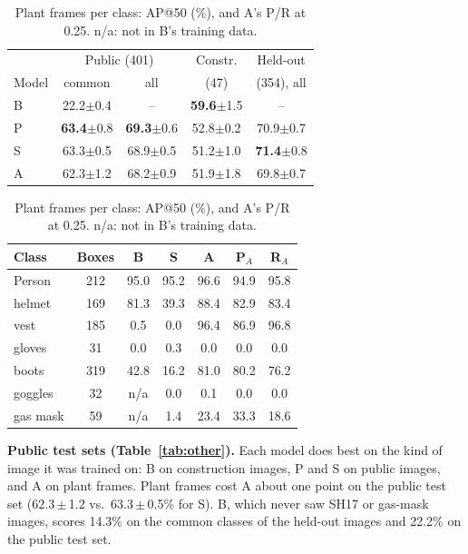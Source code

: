 \begin{table}[H]
\centering
\scriptsize
\setlength{\tabcolsep}{3pt}
\begin{minipage}[t]{0.47\columnwidth}
\centering
\caption{Public test sets, mAP@50 (\%), mean $\pm$ s.d. Held-out: SH17 + gas-mask test images, whose sources are in training.}
\label{tab:other}
\begin{tabular}{lcccc}
\toprule
& \multicolumn{2}{c}{Public (401)} & Constr. & Held-out \\
Model & common & all & (47) & (354), all \\
\midrule
B & 22.2$\pm$0.4 & -- & \textbf{59.6}$\pm$1.5 & -- \\
P & \textbf{63.4}$\pm$0.8 & \textbf{69.3}$\pm$0.6 & 52.8$\pm$0.2 & 70.9$\pm$0.7 \\
S & 63.3$\pm$0.5 & 68.9$\pm$0.5 & 51.2$\pm$1.0 & \textbf{71.4}$\pm$0.8 \\
A & 62.3$\pm$1.2 & 68.2$\pm$0.9 & 51.9$\pm$1.8 & 69.8$\pm$0.7 \\
\bottomrule
\end{tabular}
\end{minipage}\hfill
\begin{minipage}[t]{0.5\columnwidth}
\centering
\caption{Plant frames per class: AP@50 (\%), and A's P/R at 0.25. n/a: not in B's training data.}
\label{tab:perclass}
\begin{tabular}{lcccccc}
\toprule
Class & Boxes & B & S & A & P$_A$ & R$_A$ \\
\midrule
Person   & 212 & 95.0 & 95.2 & 96.6 & 94.9 & 95.8 \\
helmet   & 169 & 81.3 & 39.3 & 88.4 & 82.9 & 83.4 \\
vest     & 185 & 0.5  & 0.0  & 96.4 & 86.9 & 96.8 \\
gloves   & 31  & 0.0  & 0.3  & 0.0  & 0.0  & 0.0 \\
boots    & 319 & 42.8 & 16.2 & 81.0 & 80.2 & 76.2 \\
goggles  & 32  & n/a  & 0.0  & 0.1  & 0.0  & 0.0 \\
gas mask & 59  & n/a  & 1.4  & 23.4 & 33.3 & 18.6 \\
\bottomrule
\end{tabular}
\end{minipage}
\end{table}

\textbf{Public test sets (Table~\ref{tab:other}).} Each model does best on the kind of image it was trained on: B on construction images, P and S on public images, and A on plant frames. Plant frames cost A about one point on the public test set (62.3\,$\pm$\,1.2 vs.\ 63.3\,$\pm$\,0.5\% for S). B, which never saw SH17 or gas-mask images, scores 14.3\% on the common classes of the held-out images and 22.2\% on the public test set.

